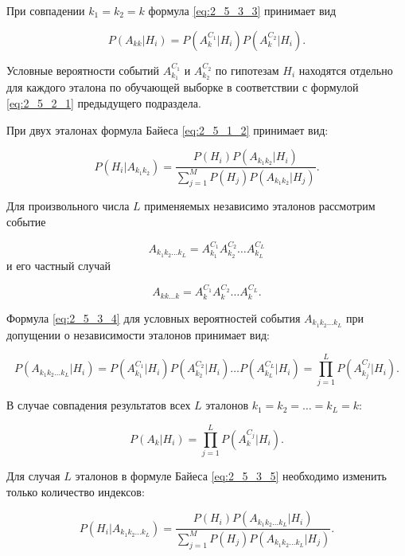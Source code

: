 При совпадении $k_1 = k_2 = k$ формула \eqref{eq:2_5_3_3} принимает вид

\begin{equation}\label{eq:2_5_3_4}
P(A_{kk}|H_i) = P(A_{k}^{C_1}|H_i) P(A_{k}^{C_2}|H_i).
\end{equation}

Условные вероятности событий $A_{k_1}^{C_1}$ и $A_{k_2}^{C_2}$ по гипотезам $H_i$ находятся отдельно для каждого эталона по обучающей выборке в соответствии с формулой \eqref{eq:2_5_2_1} предыдущего подраздела.

При двух эталонах формула Байеса \eqref{eq:2_5_1_2} принимает вид:

\begin{equation}\label{eq:2_5_3_5}
P(H_i|A_{k_1 k_2}) = \frac{P(H_i) P(A_{k_1 k_2}|H_i)}{\sum_{j=1}^M P(H_j) P(A_{k_1 k_2}|H_j)}.
\end{equation}

Для произвольного числа $L$ применяемых независимо эталонов рассмотрим событие

\begin{equation}\label{eq:2_5_3_6}
A_{k_1 k_2 \dots k_L} = A_{k_1}^{C_1} A_{k_2}^{C_2} \dots A_{k_L}^{C_L}
\end{equation}
и его частный случай

\begin{equation}\label{eq:2_5_3_7}
A_{kk \dots k} = A_{k}^{C_1} A_{k}^{C_2} \dots A_{k}^{C_L}.
\end{equation}

Формула \eqref{eq:2_5_3_4} для условных вероятностей события $A_{k_1 k_2 \dots k_L}$ при допущении о независимости эталонов принимает вид:

\begin{equation}\label{eq:2_5_3_8}
P(A_{k_1 k_2 \dots k_L}|H_i) = P(A_{k_1}^{C_1}|H_i) P(A_{k_2}^{C_2}|H_i) \dots P(A_{k_L}^{C_L}|H_i) = \prod_{j=1}^{L} P(A_{k_j}^{C_j}|H_i).
\end{equation}

В случае совпадения результатов всех $L$ эталонов $k_1 = k_2 = \dots = k_L = k$:

\begin{equation}\label{eq:2_5_3_9}
P(A_{k}|H_i) = \prod_{j=1}^{L} P(A_{k}^{C_j}|H_i).
\end{equation}

Для случая $L$ эталонов в формуле Байеса \eqref{eq:2_5_3_5} необходимо изменить только количество индексов:

\begin{equation}\label{eq:2_5_3_10}
P(H_i|A_{k_1 k_2 \dots k_L}) = \frac{P(H_i) P(A_{k_1 k_2 \dots k_L}|H_i)}{\sum_{j=1}^M P(H_j) P(A_{k_1 k_2 \dots k_L}|H_j)}.
\end{equation}

